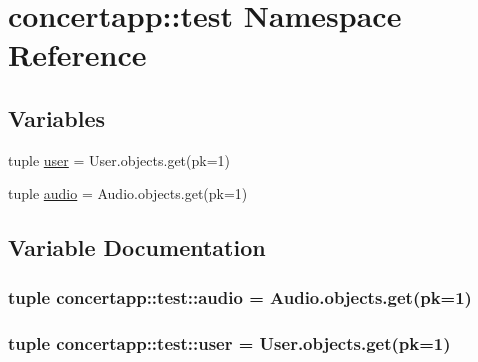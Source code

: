 \hypertarget{namespaceconcertapp_1_1test}{
\section{concertapp::test Namespace Reference}
\label{namespaceconcertapp_1_1test}
}
\subsection*{Variables}
\begin{DoxyCompactItemize}
\item 
tuple \hyperlink{namespaceconcertapp_1_1test_a189ea5cc5b79d6dc59af84522478f4d5}{user} = User.objects.get(pk=1)
\item 
tuple \hyperlink{namespaceconcertapp_1_1test_a37c797a651e429f48afd9ae7f235a069}{audio} = Audio.objects.get(pk=1)
\end{DoxyCompactItemize}


\subsection{Variable Documentation}
\hypertarget{namespaceconcertapp_1_1test_a37c797a651e429f48afd9ae7f235a069}{
\subsubsection[{audio}]{\setlength{\rightskip}{0pt plus 5cm}tuple {\bf concertapp::test::audio} = Audio.objects.get(pk=1)}}
\label{namespaceconcertapp_1_1test_a37c797a651e429f48afd9ae7f235a069}
\hypertarget{namespaceconcertapp_1_1test_a189ea5cc5b79d6dc59af84522478f4d5}{
\subsubsection[{user}]{\setlength{\rightskip}{0pt plus 5cm}tuple {\bf concertapp::test::user} = User.objects.get(pk=1)}}
\label{namespaceconcertapp_1_1test_a189ea5cc5b79d6dc59af84522478f4d5}
